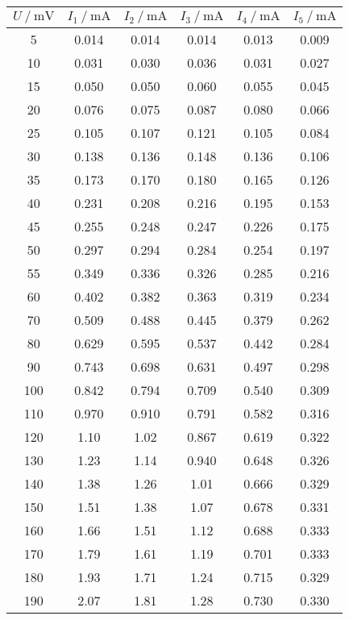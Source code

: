 \begin{table}[h]
  \centering
  \begin{tabular}{S S S S S S}
    \toprule
    {$U\:/\:\si{\milli\volt}$} & {$I_1 \:/\: \si{\milli\ampere}$} & {$I_2 \:/\: \si{\milli\ampere}$} & {$I_3 \:/\: \si{\milli\ampere}$}
     & {$I_4 \:/\: \si{\milli\ampere}$} & {$I_5 \:/\: \si{\milli\ampere}$}\\
     & 0.014 & 0.014 & 0.014 & 0.013 & 0.009\\
    10 & 0.031 & 0.030 & 0.036 & 0.031 & 0.027\\
    15 & 0.050 & 0.050 & 0.060 & 0.055 & 0.045\\
    20 & 0.076 & 0.075 & 0.087 & 0.080 & 0.066\\
    25 & 0.105 & 0.107 & 0.121 & 0.105 & 0.084\\
    30 & 0.138 & 0.136 & 0.148 & 0.136 & 0.106\\
    35 & 0.173 & 0.170 & 0.180 & 0.165 & 0.126\\
    40 & 0.231 & 0.208 & 0.216 & 0.195 & 0.153\\
    45 & 0.255 & 0.248 & 0.247 & 0.226 & 0.175\\
    50 & 0.297 & 0.294 & 0.284 & 0.254 & 0.197\\
    55 & 0.349 & 0.336 & 0.326 & 0.285 & 0.216\\
    60 & 0.402 & 0.382 & 0.363 & 0.319 & 0.234\\
    70 & 0.509 & 0.488 & 0.445 & 0.379 & 0.262\\
    80 & 0.629 & 0.595 & 0.537 & 0.442 & 0.284\\
    90 & 0.743 & 0.698 & 0.631 & 0.497 & 0.298\\
    100 & 0.842 & 0.794 & 0.709 & 0.540 & 0.309\\
    110 & 0.970 & 0.910 & 0.791 & 0.582 & 0.316\\
    120 & 1.10 & 1.02 & 0.867 & 0.619 & 0.322\\
    130 & 1.23 & 1.14 & 0.940 & 0.648 & 0.326\\
    140 & 1.38 & 1.26 & 1.01 & 0.666 & 0.329\\
    150 & 1.51 & 1.38 & 1.07 & 0.678 & 0.331\\
    160 & 1.66 & 1.51 & 1.12 & 0.688 & 0.333\\
    170 & 1.79 & 1.61 & 1.19 & 0.701 & 0.333\\
    180 & 1.93 & 1.71 & 1.24 & 0.715 & 0.329\\
    190 & 2.07 & 1.81 & 1.28 & 0.730 & 0.330\\

\end{tabular}
\end{table}
